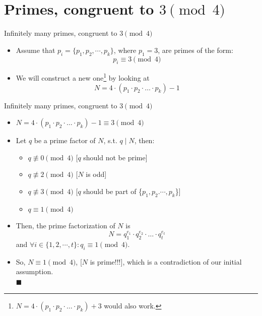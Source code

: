 \documentclass{beamer}
\begin{document}
\section{Primes, congruent to $3 \pmod{4}$}

\begin{frame}{Infinitely many primes, congruent to $3 \pmod{4}$}
    \begin{itemize}
        \item Assume that $p_i = \{p_1, p_2, \cdots, p_k\}$, where $p_1 = 3$, are primes of the form: $$p_i \equiv 3 \pmod 4$$        \item We will construct a new one\footnote{ $N = 4 \cdot (p_1 \cdot p_2 \cdot \ldots \cdot p_k) + 3$ would also work.}           by looking at 
            $$N = 4 \cdot (p_1 \cdot p_2 \cdot \ldots \cdot p_k) - 1 $$
    \end{itemize}
\end{frame}

\begin{frame}{Infinitely many primes, congruent to $3 \pmod{4}$}
    \begin{itemize}
        \item $N = 4 \cdot (p_1 \cdot p_2 \cdot \ldots \cdot p_k) - 1 \equiv 3 \pmod{4}$
        \item Let $q$ be a prime factor of $N$, s.t. $q \mid N$, then:
        \begin{itemize}
            \item $q \not\equiv 0 \pmod 4$ \hspace{0.5cm} {\scriptsize [$q$ should not be prime]}
            \item $q \not\equiv 2 \pmod 4$ \hspace{0.5cm} {\scriptsize [$N$ is odd]}
            \item $q \not\equiv 3 \pmod 4$ \hspace{0.5cm} {\scriptsize [$q$ should be part of \{$p_1, p_2. \cdots, p_k$\}]}
            \item $q \equiv 1 \pmod 4$
        \end{itemize}
        \item Then, the prime factorization of $N$ is $$N = q_1^{e_1} \cdot q_2^{e_2} \cdot \ldots \cdot q_t^{e_t}$$ and $\forall i \in \{1,2,\cdots,t\}: q_i \equiv 1 \pmod{4}$.
        \item So, $N \equiv 1 \pmod{4}$, [$N$ is prime!!!], which is a contradiction of our initial assumption. \\ \hspace{10.5cm} {\scriptsize $\blacksquare$}
    \end{itemize}
\end{frame}
\end{document}
